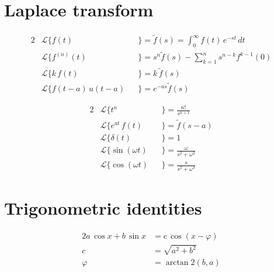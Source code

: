 \documentclass{form}
\begin{document}
\begin{minipage}[c]{0.40\textwidth}
\section*{Laplace transform} \vspace*{-2em}
\begin{alignat*}{2}
	&\mathcal{L}\{f(t)        &&\}=\tilde{f}(s)=\int_0^{\infty}{f(t)\,e^{-st}\,dt} \\
	&\mathcal{L}\{f^{(n)}(t)  &&\}=s^n\tilde{f}(s)-\sum_{k=1}^{n}{s^{n-k}f^{k-1}(0)}\\
	&\mathcal{L}\{k\,f(t)     &&\}=k\,\tilde{f}(s)   \\
	&\mathcal{L}\{f(t-a)\,u(t-a)&&\}=e^{-as}\tilde{f}(s)
\end{alignat*}
\end{minipage}%
\begin{minipage}[c]{0.20\textwidth}
\begin{alignat*}{2}
	&\mathcal{L}\{t^n         &&\}=\frac{n!}{s^{n+1}}\\
	&\mathcal{L}\{e^{at}\,f(t)&&\}=\tilde{f}(s-a)\\
	&\mathcal{L}\{\delta(t)   &&\}=1                 \\
	&\mathcal{L}\{\sin{(\omega t)}&&\}=\frac{\omega}{s^2+\omega^2} \\
	&\mathcal{L}\{\cos{(\omega t)}&&\}=\frac{s}{s^2+\omega^2}
\end{alignat*}
\end{minipage}%
\begin{minipage}[c]{0.40\textwidth}
\section*{Trigonometric identities} \vspace*{-2em}
\begin{alignat*}{2}
	a\,\cos x+b\,\sin x &=c\,\cos(x-\varphi)\\
	c &= \sqrt{a^2+b^2}\\
	\varphi &= \arctan2(b,a)
\end{alignat*}
\end{minipage}
\end{document}
